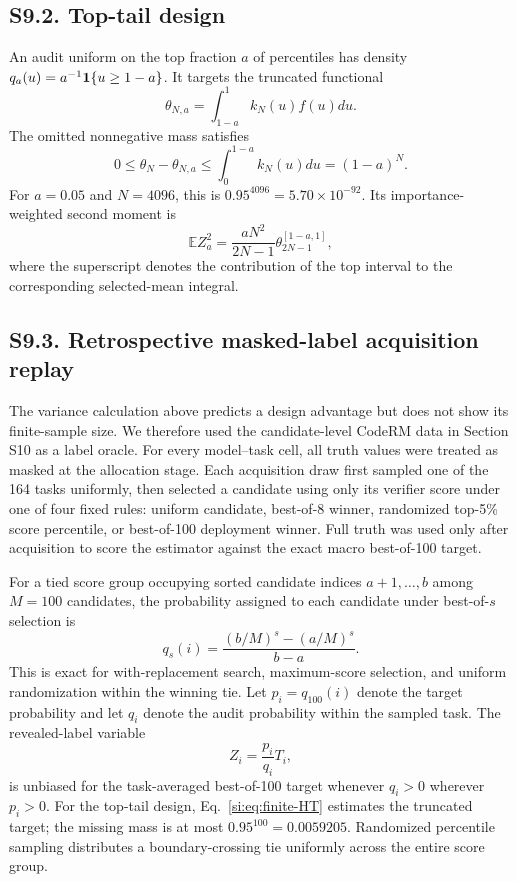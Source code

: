 \documentclass[10pt,twocolumn]{article}
\newcommand{\E}{\mathbb{E}}
\begin{document}
\subsection*{S9.2. Top-tail design}

An audit uniform on the top fraction $a$ of percentiles has density $q_a(u)=a^{-1}\mathbf 1\{u\ge1-a\}$. It targets the truncated functional
\begin{equation}
\theta_{N,a}=\int_{1-a}^1k_N(u)f(u)du.
\label{si:eq:tail-target}
\end{equation}
The omitted nonnegative mass satisfies
\begin{equation}
0\le\theta_N-\theta_{N,a}
\le\int_0^{1-a}k_N(u)du=(1-a)^N.
\label{si:eq:tail-bias}
\end{equation}
For $a=0.05$ and $N=4096$, this is $0.95^{4096}=5.70\times10^{-92}$. Its importance-weighted second moment is
\begin{equation}
\E Z_a^2
=\frac{aN^2}{2N-1}\theta_{2N-1}^{[1-a,1]},
\label{si:eq:tail-second}
\end{equation}
where the superscript denotes the contribution of the top interval to the corresponding selected-mean integral.

\subsection*{S9.3. Retrospective masked-label acquisition replay}

The variance calculation above predicts a design advantage but does not show its finite-sample size. We therefore used the candidate-level CodeRM data in Section S10 as a label oracle. For every model--task cell, all truth values were treated as masked at the allocation stage. Each acquisition draw first sampled one of the 164 tasks uniformly, then selected a candidate using only its verifier score under one of four fixed rules: uniform candidate, best-of-8 winner, randomized top-5\% score percentile, or best-of-100 deployment winner. Full truth was used only after acquisition to score the estimator against the exact macro best-of-100 target.

For a tied score group occupying sorted candidate indices $a+1,\ldots,b$ among $M=100$ candidates, the probability assigned to each candidate under best-of-$s$ selection is
\begin{equation}
q_s(i)=\frac{(b/M)^s-(a/M)^s}{b-a}.
\label{si:eq:finite-candidate-probability}
\end{equation}
This is exact for with-replacement search, maximum-score selection, and uniform randomization within the winning tie. Let $p_i=q_{100}(i)$ denote the target probability and let $q_i$ denote the audit probability within the sampled task. The revealed-label variable
\begin{equation}
Z_i=\frac{p_i}{q_i}T_i,
\label{si:eq:finite-HT}
\end{equation}
is unbiased for the task-averaged best-of-100 target whenever $q_i>0$ wherever $p_i>0$. For the top-tail design, Eq.~\ref{si:eq:finite-HT} estimates the truncated target; the missing mass is at most $0.95^{100}=0.0059205$. Randomized percentile sampling distributes a boundary-crossing tie uniformly across the entire score group.
\end{document}

